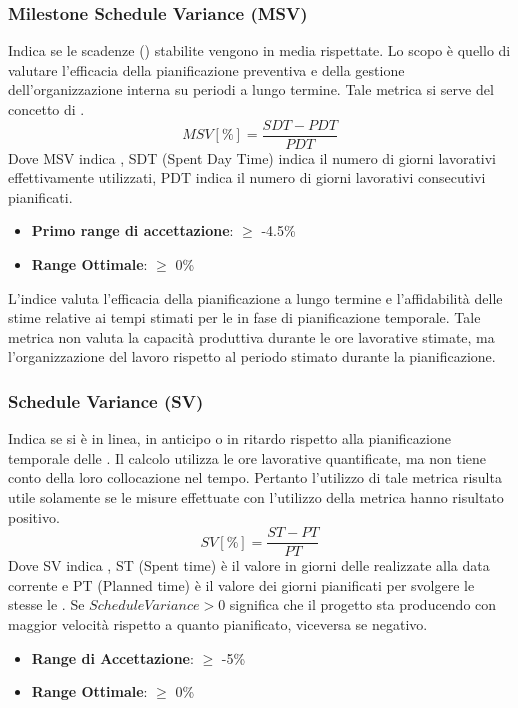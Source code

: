 \documentclass[12pt,a4paper]{article}
\begin{document}
\subsubsection{Milestone Schedule Variance (MSV)}
Indica se le scadenze () stabilite vengono in media rispettate. Lo scopo è quello di valutare l'efficacia della pianificazione preventiva e della gestione dell'organizzazione interna su periodi a lungo termine. Tale metrica si serve del concetto di .
\[MSV [\%] = \frac{SDT - PDT}{PDT}\]
Dove  MSV indica , SDT (Spent Day Time) indica il numero di giorni lavorativi effettivamente utilizzati, PDT indica il numero di giorni lavorativi consecutivi pianificati.
\begin{itemize}
	\item \textbf{Primo range di accettazione}: $\geq$ -4.5\%
	\item \textbf{Range Ottimale}: $\geq$ 0\%
\end{itemize}
L'indice  valuta l'efficacia della pianificazione a lungo termine e l'affidabilità delle stime relative ai tempi stimati per le   in fase di pianificazione temporale. Tale metrica non valuta la capacità produttiva durante le ore lavorative stimate, ma l'organizzazione del lavoro rispetto al periodo stimato durante la pianificazione.

\subsubsection{Schedule Variance (SV)} \label{schedule_variance}
Indica se si è in linea, in anticipo o in ritardo rispetto alla pianificazione temporale delle . Il calcolo utilizza le ore lavorative quantificate, ma non tiene conto della loro collocazione nel tempo. Pertanto l'utilizzo di tale metrica risulta utile solamente se le misure effettuate con l'utilizzo della metrica  hanno risultato positivo.
\[SV [\%] = \frac{ST - PT}{PT}\]
Dove SV indica  , ST (Spent time) è il valore in giorni delle   realizzate alla data corrente e PT (Planned time) è il valore dei giorni pianificati per svolgere le stesse le .
Se $ScheduleVariance > 0$ significa che il progetto sta producendo con maggior velocità rispetto a quanto pianificato, viceversa se negativo.
\begin{itemize}
\item \textbf{Range di Accettazione}: $\geq$ -5\%
\item \textbf{Range Ottimale}: $\geq$ 0\%
\end{itemize}
\end{document}

